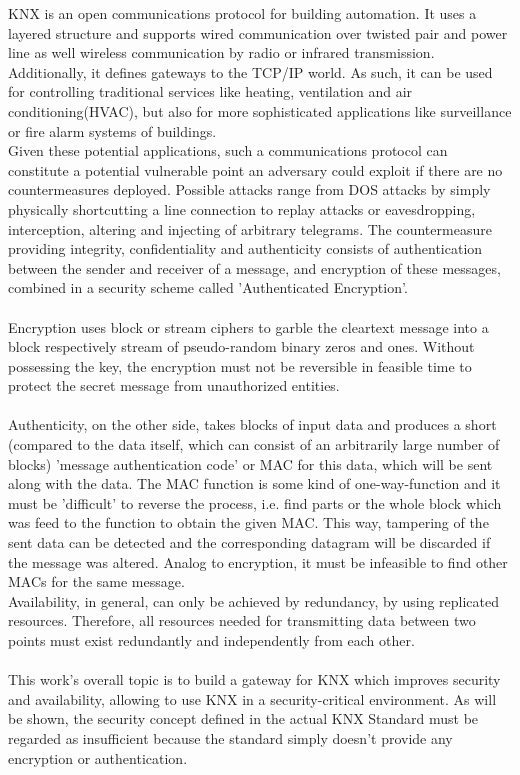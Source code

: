 \documentclass[a4paper,12pt,twoside]{memoir}
\begin{document}
KNX is an open communications protocol for building automation.
It uses a layered structure and supports wired communication over twisted pair
and power line as well wireless communication by radio or infrared transmission. 
Additionally, it defines gateways to the TCP/IP world. 
As such, it can be used for controlling traditional services like heating, ventilation and air conditioning(HVAC), but also for more
sophisticated applications \cite{knxapps}
like surveillance or fire alarm systems of buildings.
\\
Given these potential applications, such a communications protocol can constitute a potential vulnerable point an adversary
could exploit if there are no countermeasures deployed.
Possible attacks range from DOS attacks by simply physically shortcutting a line
connection to replay attacks or eavesdropping, interception, altering and injecting of arbitrary telegrams.
The countermeasure providing integrity, confidentiality and authenticity consists of authentication
between the sender and receiver of a message, and encryption of these messages, combined in a security scheme
called 'Authenticated Encryption'.
\\
\\
Encryption uses block or stream ciphers to garble the cleartext message into a block respectively stream
of pseudo-random binary zeros and ones. Without possessing the key, the encryption must not
be reversible in feasible time to protect the secret message from unauthorized entities.
\\
\\
Authenticity, on the other side, takes blocks of input data and produces a short (compared
to the data itself, which can consist of an arbitrarily large number of blocks) 'message authentication code' or MAC
for this data, which will be sent along with the data. The MAC function is some kind
of one-way-function and it must be 'difficult' to reverse the process, i.e. find parts or the whole block 
which was feed to the function to obtain the given MAC.
This way, tampering of the sent data can be
detected and the corresponding datagram will be discarded if the message was altered. Analog to encryption,
it must be infeasible to find other MACs for the same message.   
\\
Availability, in general, can only be achieved by redundancy, by using replicated resources. Therefore, all
resources needed for transmitting data between two points must exist redundantly and independently from 
each other.
\\
\\
This work's overall topic is to build a gateway for KNX which improves security and availability, allowing 
to use KNX in a security-critical environment. As will be shown, the security concept defined in the
actual KNX Standard must be regarded as insufficient because the standard simply doesn't provide any encryption 
or authentication\cite{knxSpec}. 
\end{document}
